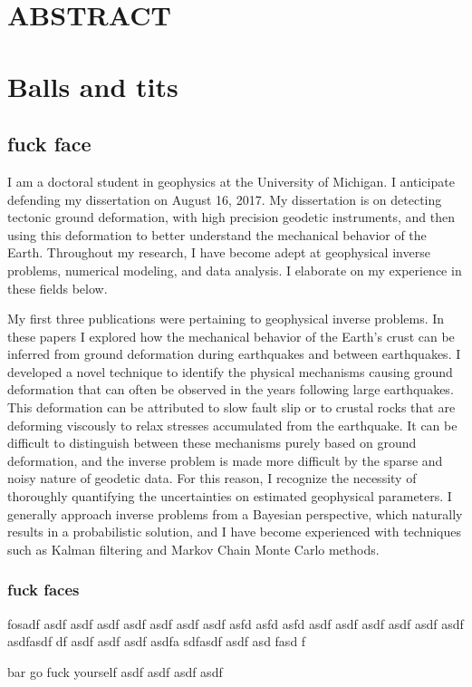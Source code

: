 \documentclass[letterpaper,12pt,oneside]{book}
\begin{document}
\chapter*{ABSTRACT} 

\mainmatter

\chapter{Balls and tits}

\section{fuck face}
I am a doctoral student in geophysics at the University of Michigan. I anticipate defending my dissertation on August 16, 2017. My dissertation is on detecting tectonic ground deformation, with high precision geodetic instruments, and then using this deformation to better understand the mechanical behavior of the Earth. Throughout my research, I have become adept at geophysical inverse problems, numerical modeling, and data analysis. I elaborate on my experience in these fields below.

My first three publications were pertaining to geophysical inverse problems. In these papers I explored how the mechanical behavior of the Earth's crust can be inferred from ground deformation during earthquakes and between earthquakes. I developed a novel technique to identify the physical mechanisms causing ground deformation that can often be observed in the years following large earthquakes. This deformation can be attributed to slow fault slip or to crustal rocks that are deforming viscously to relax stresses accumulated from the earthquake. It can be difficult to distinguish between these mechanisms purely based on ground deformation, and the inverse problem is made more difficult by the sparse and noisy nature of geodetic data. For this reason, I recognize the necessity of thoroughly quantifying the uncertainties on estimated geophysical parameters. I generally approach inverse problems from a Bayesian perspective, which naturally results in a probabilistic solution, and I have become experienced with techniques such as Kalman filtering and Markov Chain Monte Carlo methods.


\subsection{fuck faces}
fosadf asdf asdf  asdf asdf asdf asdf asdf asfd asfd asfd asdf asdf asdf asdf asdf asdf asdfasdf df asdf asdf asdf asdfa sdfasdf asdf asd fasd f

bar
go fuck yourself
asdf
\newpage
asdf 
asdf
asdf
\end{document}
